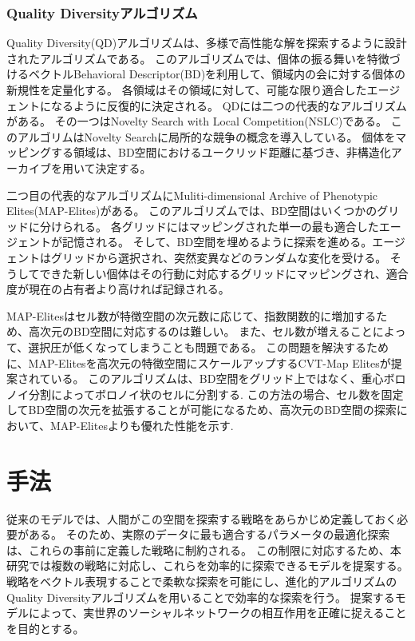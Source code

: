 \documentclass[uplatex,11pt,openany]{ujreport}
\begin{document}
        \subsection{Quality Diversityアルゴリズム}
        Quality Diversity(QD)アルゴリズムは、多様で高性能な解を探索するように設計されたアルゴリズムである\cite{pugh_quality_2016}。
        このアルゴリズムでは、個体の振る舞いを特徴づけるベクトルBehavioral Descriptor(BD)を利用して、領域内の会に対する個体の新規性を定量化する。
        各領域はその領域に対して、可能な限り適合したエージェントになるように反復的に決定される。
        QDには二つの代表的なアルゴリズムがある。
        その一つはNovelty Search with Local Competition(NSLC)\cite{lehman_evolving_2011}である。
        このアルゴリムはNovelty Searchに局所的な競争の概念を導入している。
        個体をマッピングする領域は、BD空間におけるユークリッド距離に基づき、非構造化アーカイブを用いて決定する。

        二つ目の代表的なアルゴリズムにMuliti-dimensional Archive of Phenotypic Elites(MAP-Elites)\cite{mouret_illuminating_2015}がある。
        このアルゴリズムでは、BD空間はいくつかのグリッドに分けられる。
        各グリッドにはマッピングされた単一の最も適合したエージェントが記憶される。
        そして、BD空間を埋めるように探索を進める。エージェントはグリッドから選択され、突然変異などのランダムな変化を受ける。
        そうしてできた新しい個体はその行動に対応するグリッドにマッピングされ、適合度が現在の占有者より高ければ記録される。

        MAP-Elitesはセル数が特徴空間の次元数に応じて、指数関数的に増加するため、高次元のBD空間に対応するのは難しい。
        また、セル数が増えることによって、選択圧が低くなってしまうことも問題である。
        この問題を解決するために、MAP-Elitesを高次元の特徴空間にスケールアップするCVT-Map Elites\cite{vassiliades_using_2017}が提案されている。
        このアルゴリズムは、BD空間をグリッド上ではなく、重心ボロノイ分割によってボロノイ状のセルに分割する.
        この方法の場合、セル数を固定してBD空間の次元を拡張することが可能になるため、高次元のBD空間の探索において、MAP-Elitesよりも優れた性能を示す.






\chapter{手法}
    従来のモデルでは、人間がこの空間を探索する戦略をあらかじめ定義しておく必要がある。
    そのため、実際のデータに最も適合するパラメータの最適化探索は、これらの事前に定義した戦略に制約される\cite{suda_exploration_2022,suda_agent-based_2022,ubaldi_emergence_2021}。
    この制限に対応するため、本研究では複数の戦略に対応し、これらを効率的に探索できるモデルを提案する。
    戦略をベクトル表現することで柔軟な探索を可能にし、進化的アルゴリズムのQuality Diversityアルゴリズムを用いることで効率的な探索を行う。
    提案するモデルによって、実世界のソーシャルネットワークの相互作用を正確に捉えることを目的とする。
\end{document}
